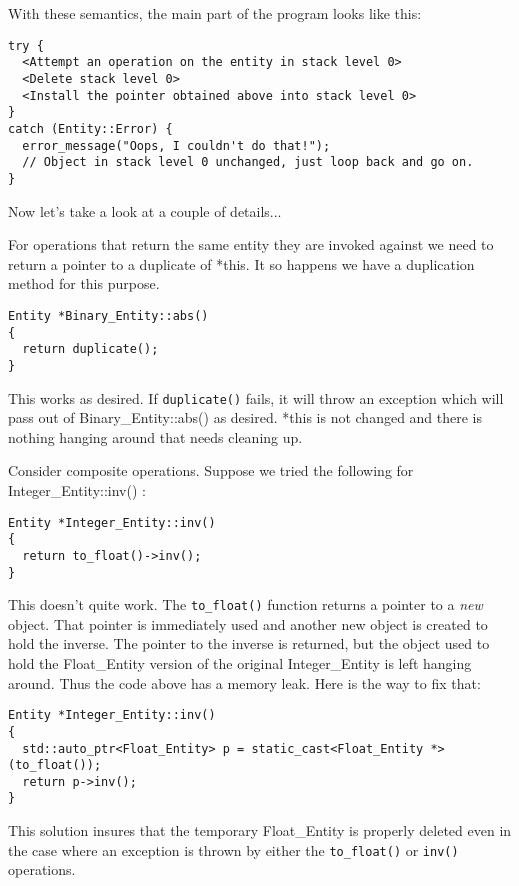 \documentclass{report}
\begin{document}
With these semantics, the main part of the program looks like this:

\begin{verbatim}
try {
  <Attempt an operation on the entity in stack level 0>
  <Delete stack level 0>
  <Install the pointer obtained above into stack level 0>
}
catch (Entity::Error) {
  error_message("Oops, I couldn't do that!");
  // Object in stack level 0 unchanged, just loop back and go on.
}
\end{verbatim}

Now let's take a look at a couple of details...

For operations that return the same entity they are invoked against we need to return a pointer to a duplicate of *this. It so happens we have a duplication method for this purpose.

\begin{verbatim}
Entity *Binary_Entity::abs()
{
  return duplicate();
}
\end{verbatim}

This works as desired. If \texttt{duplicate()} fails, it will throw an exception which will pass out of Binary\_Entity::abs() as desired. *this is not changed and there is nothing hanging around that needs cleaning up.

Consider composite operations. Suppose we tried the following for Integer\_Entity::inv() :

\begin{verbatim}
Entity *Integer_Entity::inv()
{
  return to_float()->inv();
}
\end{verbatim}

This doesn't quite work. The \texttt{to\_float()} function returns a pointer to a \emph{new} object. That pointer is immediately used and another new object is created to hold the inverse. The pointer to the inverse is returned, but the object used to hold the Float\_Entity version of the original Integer\_Entity is left hanging around. Thus the code above has a memory leak. Here is the way to fix that:

\begin{verbatim}
Entity *Integer_Entity::inv()
{
  std::auto_ptr<Float_Entity> p = static_cast<Float_Entity *>(to_float());
  return p->inv();
}
\end{verbatim}

This solution insures that the temporary Float\_Entity is properly deleted even in the case where an exception is thrown by either the \texttt{to\_float()} or \texttt{inv()} operations.
\end{document}
